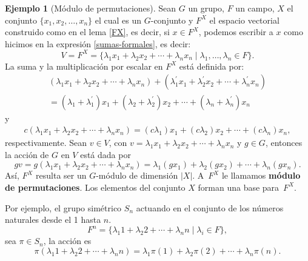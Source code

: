 \documentclass[12pt]{book}
\theoremstyle{definition}
\newtheorem{example}[theorem]{Ejemplo}
\newcounter{in}
\newcounter{ini}
\begin{document}
\begin{example}[Módulo de permutaciones]
  \label{CS}
  Sean $G$ un grupo, $F$ un campo, $X$ el conjunto
  $\{x_{1},x_{2},\ldots,x_{n}\}$ el cual es un $G$-conjunto y $F^{X}$ el
  espacio vectorial construido como en el lema \ref{FX}, es decir,
  si $x\in F^{X}$, podemos escribir a $x$ como hicimos en la expresión
\ref{sumas-formales}, es decir:
  \begin{equation*}
    V=F^{X}=\{\lambda_{1}x_{1}+\lambda_{2}x_{2}+\cdots
    +\lambda_{n}x_{n}\mid\lambda_{1},\ldots,\lambda_{n}\in F\}.
  \end{equation*}
  La suma y la multiplicación por escalar
  en $F^{X}$ está definida por:
  \begin{eqnarray*}
    (\lambda_{1}x_{1}+\lambda_{2}x_{2}+\cdots
    +\lambda_{n}x_{n})+(\lambda^{'}_{1}x_{1}+\lambda^{'}_{2}x_{2}+\cdots +\lambda^{'}_{n}x_{n})\\
    =(\lambda_{1}+\lambda^{'}_{1})x_{1}+(\lambda_{2}+\lambda^{'}_{2})x_{2}+\cdots
    +(\lambda_{n}+\lambda^{'}_{n})x_{n}
  \end{eqnarray*}
  y
  \begin{eqnarray*}
    c(\lambda_{1}x_{1}+\lambda_{2}x_{2}+\cdots +\lambda_{n}x_{n})=(c\lambda_{1})x_{1}+(c\lambda_{2})x_{2}+\cdots +(c\lambda_{n})x_{n},
  \end{eqnarray*}
  respectivamente. Sean $v\in V$, con
  $v=\lambda_{1}x_{1}+\lambda_{2}x_{2}+\cdots+\lambda_{n}x_{n}$ y $g\in G$, entonces la acción de $G$ en $V$ está dada por
  \begin{equation*}
    gv=g(\lambda_{1}x_{1}+\lambda_{2}x_{2}+\cdots +\lambda_{n}x_{n})=\lambda_{1}(gx_{1})+\lambda_{2}(gx_{2})+\cdots +\lambda_{n}(gx_{n}).
  \end{equation*}
  Así, $F^{X}$ resulta ser un $G$-módulo de dimensión $|X|$. A~$F^{X}$ le llamamos
  \textbf{módulo de permutaciones}. Los elementos del conjunto $X$ forman una base para~$F^{X}$.

  Por ejemplo, el grupo simétrico $S_{n}$ actuando en el conjunto de
  los números naturales desde el 1 hasta $n$. %
  \begin{equation*}
    F^{n}=\{\lambda_{1}1+\lambda_{2}2+\cdots+\lambda_{n}n\mid
    \lambda_{i}\in F\},
  \end{equation*}
  sea $\pi\in S_{n}$, la acción es
  \begin{equation*}
    \pi(\lambda_{1}1+\lambda_{2}2+\cdots+\lambda_{n}n)=\lambda_{1}\pi(1)+\lambda_{2}\pi(2)+\cdots+\lambda_{n}\pi(n).
  \end{equation*}


\end{example}
\end{document}

